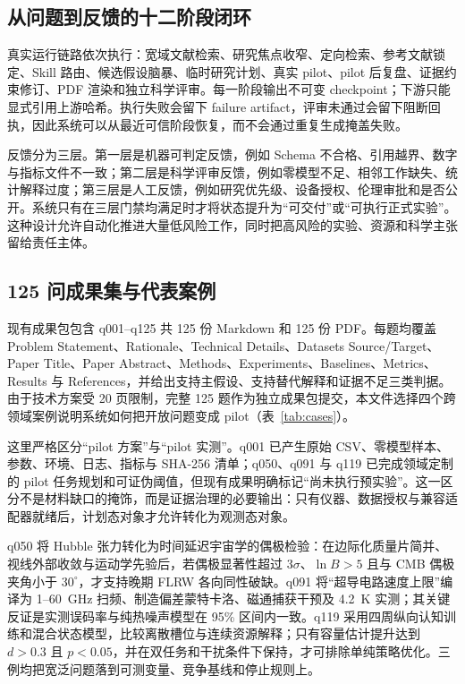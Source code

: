 \documentclass[12pt]{article}
\begin{document}
\subsection*{从问题到反馈的十二阶段闭环}

真实运行链路依次执行：宽域文献检索、研究焦点收窄、定向检索、参考文献锁定、Skill 路由、候选假设脑暴、临时研究计划、真实 pilot、pilot 后复盘、证据约束修订、PDF 渲染和独立科学评审。每一阶段输出不可变 checkpoint；下游只能显式引用上游哈希。执行失败会留下 failure artifact，评审未通过会留下阻断回执，因此系统可以从最近可信阶段恢复，而不会通过重复生成掩盖失败。

反馈分为三层。第一层是机器可判定反馈，例如 Schema 不合格、引用越界、数字与指标文件不一致；第二层是科学评审反馈，例如零模型不足、相邻工作缺失、统计解释过度；第三层是人工反馈，例如研究优先级、设备授权、伦理审批和是否公开。系统只有在三层门禁均满足时才将状态提升为“可交付”或“可执行正式实验”。这种设计允许自动化推进大量低风险工作，同时把高风险的实验、资源和科学主张留给责任主体。

\subsection*{125 问成果集与代表案例}

现有成果包包含 q001--q125 共 125 份 Markdown 和 125 份 PDF。每题均覆盖 Problem Statement、Rationale、Technical Details、Datasets Source/Target、Paper Title、Paper Abstract、Methods、Experiments、Baselines、Metrics、Results 与 References，并给出支持主假设、支持替代解释和证据不足三类判据。由于技术方案受 20 页限制，完整 125 题作为独立成果包提交，本文件选择四个跨领域案例说明系统如何把开放问题变成 pilot（表~\ref{tab:cases}）。

这里严格区分“pilot 方案”与“pilot 实测”。q001 已产生原始 CSV、零模型样本、参数、环境、日志、指标与 SHA-256 清单；q050、q091 与 q119 已完成领域定制的 pilot 任务规划和可证伪阈值，但现有成果明确标记“尚未执行预实验”。这一区分不是材料缺口的掩饰，而是证据治理的必要输出：只有仪器、数据授权与兼容适配器就绪后，计划态对象才允许转化为观测态对象。

q050 将 Hubble 张力转化为时间延迟宇宙学的偶极检验：在边际化质量片简并、视线外部收敛与运动学先验后，若偶极显著性超过 3$\sigma$、$\ln B>5$ 且与 CMB 偶极夹角小于 $30^\circ$，才支持晚期 FLRW 各向同性破缺。q091 将“超导电路速度上限”编译为 1--60~GHz 扫频、制造偏差蒙特卡洛、磁通捕获干预及 4.2~K 实测；其关键反证是实测误码率与纯热噪声模型在 95\% 区间内一致。q119 采用四周纵向认知训练和混合状态模型，比较离散槽位与连续资源解释；只有容量估计提升达到 $d>0.3$ 且 $p<0.05$，并在双任务和干扰条件下保持，才可排除单纯策略优化。三例均把宽泛问题落到可测变量、竞争基线和停止规则上。
\end{document}
